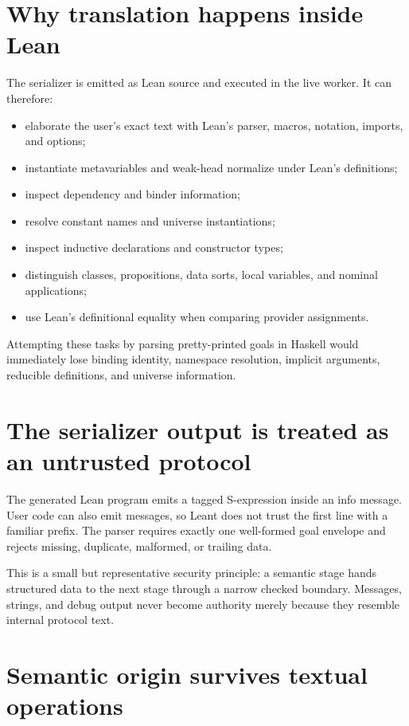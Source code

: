 \documentclass[10pt,letterpaper,oneside,openany]{report}
\newcommand{\term}[1]{\texttt{\detokenize{#1}}}
\begin{document}
\section{Why translation happens inside Lean}

The serializer is emitted as Lean source and executed in the live worker.  It can therefore:

\begin{itemize}
\item elaborate the user's exact text with Lean's parser, macros, notation, imports, and options;
\item instantiate metavariables and weak-head normalize under Lean's definitions;
\item inspect \term{Expr.forallE} dependency and binder information;
\item resolve constant names and universe instantiations;
\item inspect inductive declarations and constructor types;
\item distinguish classes, propositions, data sorts, local variables, and nominal applications;
\item use Lean's definitional equality when comparing provider assignments.
\end{itemize}

Attempting these tasks by parsing pretty-printed goals in Haskell would immediately lose binding identity, namespace resolution, implicit arguments, reducible definitions, and universe information.

\section{The serializer output is treated as an untrusted protocol}

The generated Lean program emits a tagged S-expression inside an info message.  User code can also emit messages, so Leant does not trust the first line with a familiar prefix.  The parser requires exactly one well-formed goal envelope and rejects missing, duplicate, malformed, or trailing data.

This is a small but representative security principle: a semantic stage hands structured data to the next stage through a narrow checked boundary.  Messages, strings, and debug output never become authority merely because they resemble internal protocol text.

\section{Semantic origin survives textual operations}
\end{document}
